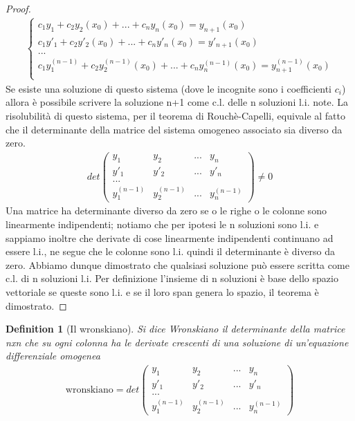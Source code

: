 \documentclass[10pt,a4paper]{article}
\newtheorem{proof}{Proof}
\newtheorem{definition}{Definition}
\begin{document}
\begin{proof}
\begin{align*}
\begin{cases}
			c_1 y_1 + c_2y_2(x_0) +...+  c_n y_n(x_0) = y_{n+1}(x_0)\\
			c_1 y'_1 + c_2y'_2(x_0) +...+  c_n y'_n(x_0) = y'_{n+1}(x_0)\\
			...\\
			c_1 y_1^{(n-1)} + c_2y_2^{(n-1)}(x_0) +...+  c_n y_n^{(n-1)}(x_0) = y_{n+1}^{(n-1)}(x_0)\\
		\end{cases}
	\end{align*}
	Se esiste una soluzione di questo sistema (dove le incognite sono i coefficienti \(c_i\)) allora è possibile scrivere la soluzione n+1 come c.l. delle n soluzioni l.i. note. La risolubilità di questo sistema, per il teorema di Rouchè-Capelli, equivale al fatto che il determinante della matrice del sistema omogeneo associato sia diverso da zero.
	\begin{align*}
	det
	\begin{pmatrix}
		y_1&y_2&...&y_n\\
		y'_1&y'_2&...&y'_n\\
		...\\
		y^{(n-1)}_1&y^{(n-1)}_2&...&y^{(n-1)}_n
	\end{pmatrix}\neq 0
	\end{align*}
	Una matrice ha determinante diverso da zero se o le righe o le colonne sono linearmente indipendenti; notiamo che per ipotesi le n soluzioni sono l.i. e sappiamo inoltre che derivate di cose linearmente indipendenti continuano ad essere l.i., ne segue che le colonne sono l.i. quindi il determinante è diverso da zero. Abbiamo dunque dimostrato che qualsiasi soluzione può essere scritta come c.l. di n soluzioni l.i. Per definizione l'insieme di n soluzioni è base dello spazio vettoriale se queste sono l.i. e se il loro span genera lo spazio, il teorema è dimostrato. 
	
\end{proof}
\begin{definition}[Il wronskiano]
	Si dice Wronskiano il determinante della matrice n\textit{x}n che su ogni colonna ha le derivate crescenti di una soluzione di un'equazione differenziale omogenea
	\begin{align*}
		\text{wronskiano}=det
		\begin{pmatrix}
			y_1&y_2&...&y_n\\
			y'_1&y'_2&...&y'_n\\
			...\\
			y^{(n-1)}_1&y^{(n-1)}_2&...&y^{(n-1)}_n
		\end{pmatrix}
	\end{align*}
\end{definition}
\end{document}
